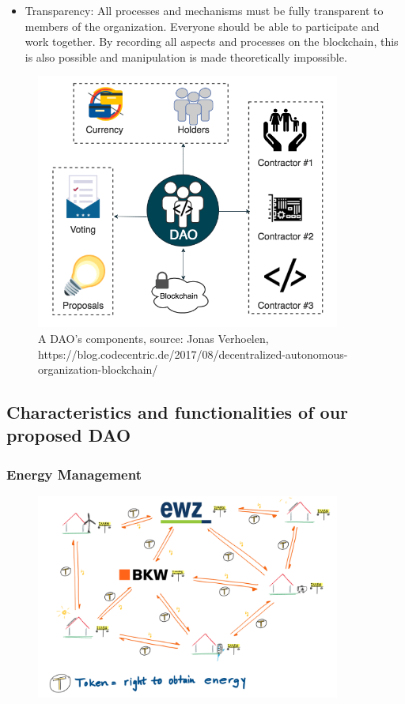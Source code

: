 \documentclass{scrartcl}
\begin{document}
\begin{itemize}
    	\item Transparency: \newline
    	All processes and mechanisms must be fully transparent to members of the organization. Everyone should be able to participate and work together. By recording all aspects and processes on the blockchain, this is also possible and manipulation is made theoretically impossible.
    \end{itemize}

	\begin{figure} [h]
		\centering
		\includegraphics[width=100mm,scale=0.5]{DAO's_components_Jonas_Verhoelen.png}
		\caption{A DAO's components, source: Jonas Verhoelen, https://blog.codecentric.de/2017/08/decentralized-autonomous-organization-blockchain/}
	\end{figure}

	\subsection{Characteristics and functionalities of our proposed DAO}
	
	\subsubsection{Energy Management}
	
	\begin{figure} [h]
		\centering
		\includegraphics[width=100mm,scale=0.5]{section_3_3_1.png}
	\end{figure}
	
\end{document}
